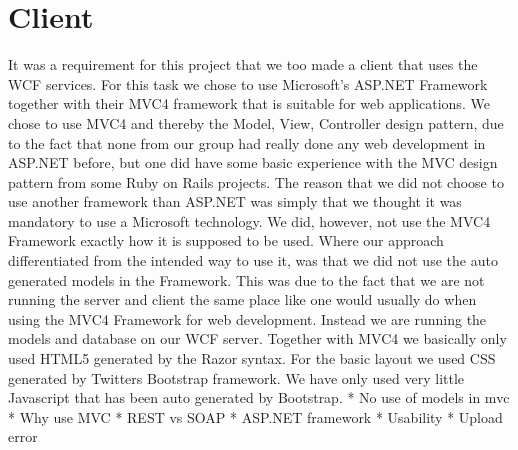 \section{Client}

It was a requirement for this project that we too made a client that uses the WCF services. 
For this task we chose to use Microsoft's ASP.NET Framework together with their MVC4 framework
that is suitable for web applications. We chose to use MVC4 and thereby the Model, View, Controller
design pattern, due to the fact that none from our group had really done any web development in
ASP.NET before, but one did have some basic experience with the MVC design pattern from some 
Ruby on Rails projects. The reason that we did not choose to use another framework than ASP.NET
was simply that we thought it was mandatory to use a Microsoft technology. 
We did, however, not use the MVC4 Framework exactly how it is supposed to be used. Where our
approach differentiated from the intended way to use it, was that we did not use the auto generated
models in the Framework. This was due to the fact that we are not running the server and client
the same place like one would usually do when using the MVC4 Framework for web development. 
Instead we are running the models and database on our WCF server.
Together with MVC4 we basically only used HTML5 generated by the Razor syntax. For the 
basic layout we used CSS generated by Twitters Bootstrap framework. We have only used very little
Javascript that has been auto generated by Bootstrap.
* No use of models in mvc
* Why use MVC
* REST vs SOAP
* ASP.NET framework
* Usability
* Upload error



